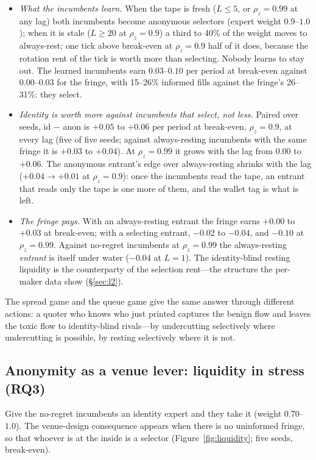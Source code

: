 \documentclass[11pt]{article}
\begin{document}
\begin{itemize}
\item \emph{What the incumbents learn.} When the tape is fresh ($L\le5$, or $\rho_z=0.99$ at any lag) both incumbents become anonymous selectors (expert weight $0.9$--$1.0$); when it is stale ($L\ge20$ at $\rho_z=0.9$) a third to 40\% of the weight moves to always-rest; one tick above break-even at $\rho_z=0.9$ half of it does, because the rotation rent of the tick is worth more than selecting. Nobody learns to stay out. The learned incumbents earn $0.03$--$0.10$ per period at break-even against $0.00$--$0.03$ for the fringe, with 15--26\% informed fills against the fringe's 26--31\%: they select.
\item \emph{Identity is worth more against incumbents that select, not less.} Paired over seeds, id $-$ anon is $+0.05$ to $+0.06$ per period at break-even, $\rho_z=0.9$, at every lag (five of five seeds; against always-resting incumbents with the same fringe it is $+0.03$ to $+0.04$). At $\rho_z=0.99$ it grows with the lag from $0.00$ to $+0.06$. The anonymous entrant's edge over always-resting shrinks with the lag ($+0.04\to+0.01$ at $\rho_z=0.9$): once the incumbents read the tape, an entrant that reads only the tape is one more of them, and the wallet tag is what is left.
\item \emph{The fringe pays.} With an always-resting entrant the fringe earns $+0.00$ to $+0.03$ at break-even; with a selecting entrant, $-0.02$ to $-0.04$, and $-0.10$ at $\rho_z=0.99$. Against no-regret incumbents at $\rho_z=0.99$ the always-resting \emph{entrant} is itself under water ($-0.04$ at $L=1$). The identity-blind resting liquidity is the counterparty of the selection rent---the structure the per-maker data show (\S\ref{sec:l2}).
\end{itemize}
The spread game and the queue game give the same answer through different actions: a quoter who knows who just printed captures the benign flow and leaves the toxic flow to identity-blind rivals---by undercutting selectively where undercutting is possible, by resting selectively where it is not.

\subsection{Anonymity as a venue lever: liquidity in stress (RQ3)}\label{sec:anonymity}
Give the no-regret incumbents an identity expert and they take it (weight $0.70$--$1.0$). The venue-design consequence appears when there is no uninformed fringe, so that whoever is at the inside is a selector (Figure~\ref{fig:liquidity}; five seeds, break-even).
\end{document}
